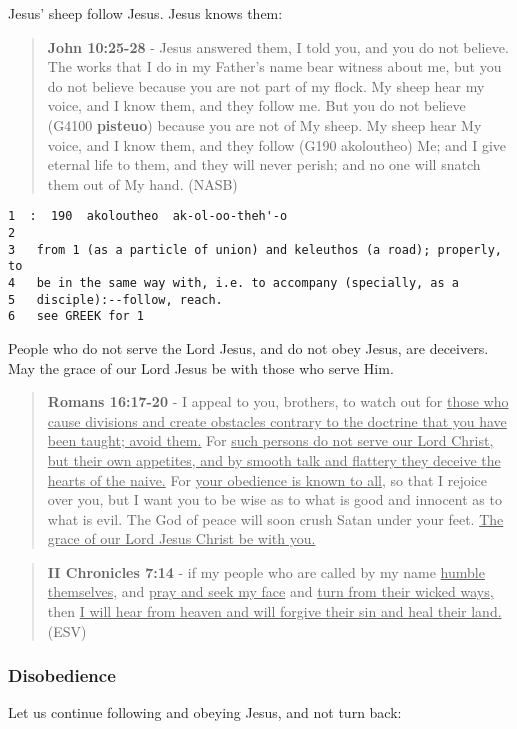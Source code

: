 \documentclass[11pt]{article}
\begin{document}
Jesus' sheep follow Jesus. Jesus knows them:

\begin{quote}
\textbf{John 10:25-28} - Jesus answered them, I told you, and you do not believe. The works that I do in my Father's name bear witness about me, but you do not believe because you are not part of my flock. My sheep hear my voice, and I know them, and they follow me. But you do not believe (G4100 \textbf{pisteuo}) because you are not of My sheep. My sheep hear My voice, and I know them, and they follow (G190 akoloutheo) Me; and I give eternal life to them, and they will never perish; and no one will snatch them out of My hand. (NASB)
\end{quote}

\begin{verbatim}
1  :  190  akoloutheo  ak-ol-oo-theh'-o
2  
3   from 1 (as a particle of union) and keleuthos (a road); properly, to
4   be in the same way with, i.e. to accompany (specially, as a
5   disciple):--follow, reach.
6   see GREEK for 1
\end{verbatim}

People who do not serve the Lord Jesus, and do not obey Jesus, are deceivers. May the grace of our Lord Jesus be with those who serve Him.

\begin{quote}
\textbf{Romans 16:17-20} - I appeal to you, brothers, to watch out for \uline{those who cause divisions and create obstacles contrary to the doctrine that you have been taught; avoid them.} For \uline{such persons do not serve our Lord Christ, but their own appetites, and by smooth talk and flattery they deceive the hearts of the naive.} For \uline{your obedience is known to all}, so that I rejoice over you, but I want you to be wise as to what is good and innocent as to what is evil. The God of peace will soon crush Satan under your feet. \uline{The grace of our Lord Jesus Christ be with you.}
\end{quote}

\begin{quote}
\textbf{II Chronicles 7:14} - if my people who are called by my name \uline{humble themselves,} and \uline{pray and seek my face} and \uline{turn from their wicked ways,} then \uline{I will hear from heaven and will forgive their sin and heal their land.} (ESV)
\end{quote}

\subsubsection{Disobedience}
\label{sec:org86ebbc1}
Let us continue following and obeying Jesus, and not turn back:
\end{document}
